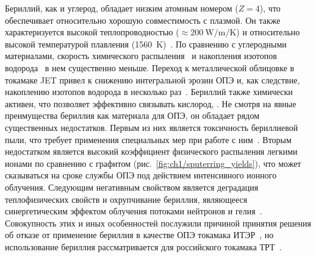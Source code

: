 Бериллий, как и углерод, обладает низким атомным номером ($Z=4$), что обеспечивает относительно хорошую совместимость с плазмой. Он также характеризуется высокой теплопроводностью (\( \approx \SI{200}{\watt\per\meter\per\K} \)) и относительно высокой температурой плавления (\SI{1560}{\kelvin})~\cite{Ho1974}. По сравнению с углеродными материалами, скорость химического распыления~\cite{Brezinsek2014} и накопления изотопов водорода~\cite{DeTemmerman2021} в нем существенно меньше. Переход к металлической облицовке в токамаке JET привел к снижению интегральной эрозии ОПЭ и, как следствие, накоплению изотопов водорода в несколько раз~\cite{Brezinsek2015}. Бериллий также химически активен, что позволяет эффективно связывать кислород, . Не смотря на явные преимущества бериллия как материала для ОПЭ, он обладает рядом существенных недостатков. Первым из них является токсичность бериллиевой пыли, что требует применения специальных мер при работе с ним~\cite{Strupp2011}. Вторым недостатком является высокий коэффициент физического распыления легкими ионами по сравнению с графитом (рис.~\cref{fig:ch1/sputerring_yields}), что может сказываться на сроке службы ОПЭ под действием интенсивного ионного облучения. Следующим негативным свойством является деградация теплофизических свойств и охрупчивание бериллия, являющееся синергетическим эффектом облучения потоками нейтронов и гелия~\cite{Kesternich2003,Gilbert2012}. Совокупность этих и иных особенностей послужили причиной принятия решения об отказе от применение бериллия в качестве ОПЭ токамака ИТЭР~\cite{Barabaschi2025}, но использование бериллия  рассматривается для российского токамака ТРТ~\cite{Mazul2021,Piskarev2024}.

